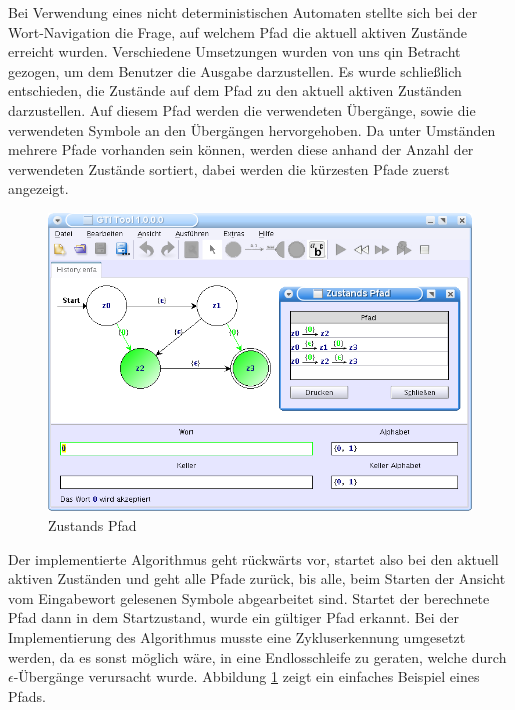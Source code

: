 Bei Verwendung eines nicht deterministischen Automaten stellte sich bei der
Wort-Navigation die Frage, auf welchem Pfad die aktuell aktiven Zustände erreicht
wurden. Verschiedene Umsetzungen wurden von uns qin Betracht gezogen, um dem
Benutzer die Ausgabe darzustellen. Es wurde schließlich entschieden, die Zustände
auf dem Pfad zu den aktuell aktiven Zuständen darzustellen. Auf diesem Pfad
werden die verwendeten Übergänge, sowie die verwendeten Symbole an den Übergängen
hervorgehoben. Da unter Umständen mehrere Pfade vorhanden sein können, werden
diese anhand der Anzahl der verwendeten Zustände sortiert, dabei werden die
kürzesten Pfade zuerst angezeigt.\vspace{10pt}

\begin{figure}[h!]
\begin{center}
\includegraphics[width=12cm]{../images/history_path.png}
\caption{Zustands Pfad}
\label{FigureHistoryPath}
\end{center}
\end{figure}
\vspace{10pt}

Der implementierte Algorithmus geht rückwärts vor, startet also bei den aktuell
aktiven Zuständen und geht alle Pfade zurück, bis alle, beim Starten der Ansicht
vom Eingabewort gelesenen Symbole abgearbeitet sind. Startet der berechnete Pfad
dann in dem Startzustand, wurde ein gültiger Pfad erkannt. Bei der
Implementierung des Algorithmus musste eine Zykluserkennung umgesetzt werden, da
es sonst möglich wäre, in eine Endlosschleife zu geraten, welche durch
$\epsilon$-Übergänge verursacht wurde. Abbildung \ref{FigureHistoryPath} zeigt
ein einfaches Beispiel eines Pfads.\vspace{10pt}


